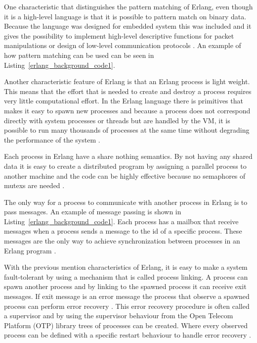  One characteristic that distinguishes the pattern matching of Erlang, even though it is a high-level language is that it is possible to pattern match on binary data. Because the language was designed for embedded system this was included and it gives the possibility to implement high-level descriptive functions for packet manipulations or design of low-level communication protocols \citep{sivieri2012erlang}. An example of how pattern matching can be used can be seen in Listing~\ref{erlang_background_code1}.

\begin{minipage}{\linewidth}

\end{minipage}

Another characteristic feature of Erlang is that an Erlang process is light weight. This means that the effort that is needed to create and destroy a process requires very little computational effort. In the Erlang language there is primitives that makes it easy to spawn new processes and because a process does not correspond directly with system processes or threads but are handled by the VM, it is possible to run many thousands of processes at the same time without degrading the performance of the system \citep{armstrong2003concurrency}. 

Each process in Erlang have a share nothing semantics. By not having any shared data it is easy to create a distributed program by assigning a parallel process to another machine and the code can be highly effective because no semaphores of mutexs are needed \citep{armstrong2003concurrency}.

The only way for a process to communicate with another process in Erlang is to pass messages. An example of message passing is shown in Listing~\ref{erlang_background_code1}. Each process has a mailbox that receive messages when a process sends a message to the id of a specific process. These messages are the only way to achieve synchronization between processes in an Erlang program \citep{armstrong2003concurrency}.

With the previous mention characteristics of Erlang, it is easy to make a system fault-tolerant by using a mechanism that is called process linking. A process can spawn another process and by linking to the spawned process it can receive exit messages. If exit message is an error message the process that observe a spawned process can perform error recovery \citep{armstrong2003concurrency}. This error recovery procedure is often called a supervisor and by using the supervisor behaviour from the Open Telecom Platform (OTP) library trees of processes can be created. Where every observed process can be defined with a specific restart behaviour to handle error recovery \citep{armstrong2003concurrency, sivieri2012erlang}. 

